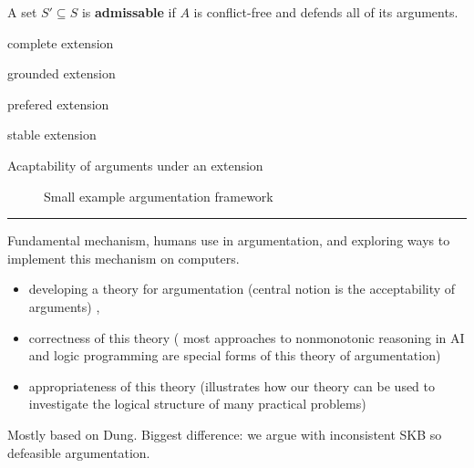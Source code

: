 \begin{definition}
	A set $S' \subseteq S$ is \textbf{admissable} if $A$ is conflict-free and defends all of its arguments.
\end{definition}



\begin{definition}
complete extension	
\end{definition}

\begin{definition}
grounded extension	
\end{definition}

\begin{definition}
prefered extension	
\end{definition}

\begin{definition}
stable extension	
\end{definition}

\begin{definition}
	Acaptability of arguments under an extension
\end{definition}



\begin{figure}[h]
\centering
{}
\caption{Small example argumentation framework}
\label{fig:small_af}
\end{figure}








\bigskip
\hrule	
\bigskip



Fundamental mechanism, humans use in argumentation, and exploring ways to implement this mechanism on computers. 
\begin{itemize}
	\item developing a theory for argumentation (central notion is the acceptability of arguments) \cite{Dung1995321}, \cite{Modgil2009}
	\item correctness of this theory ( most approaches to nonmonotonic reasoning in AI and logic programming are special forms of this theory of argumentation)
	\item appropriateness of this theory (illustrates how our theory can be used to investigate the logical structure of many practical problems)
\end{itemize}
Mostly based on Dung\cite{Dung1995321}. Biggest difference: we argue with inconsistent SKB so defeasible argumentation. 


